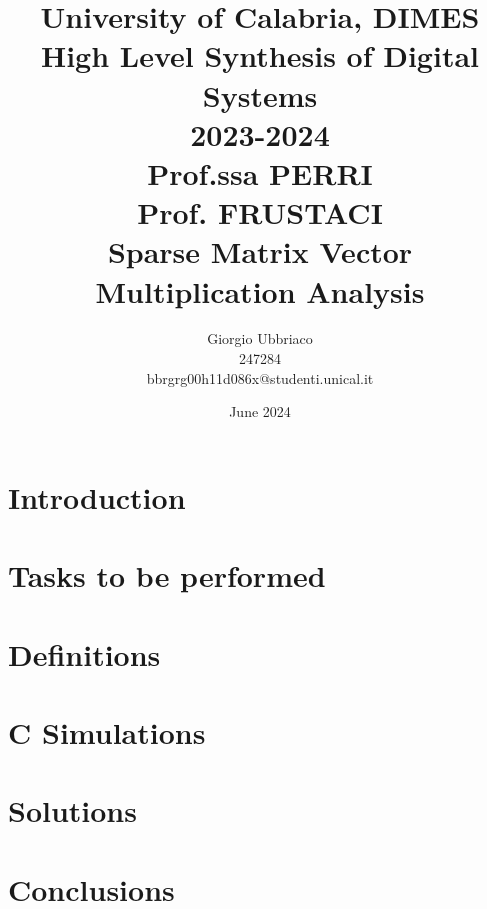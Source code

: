 \documentclass{article}
\title{University of Calabria, DIMES\\High Level Synthesis of Digital Systems\\2023-2024\\Prof.ssa PERRI\\Prof. FRUSTACI\\Sparse Matrix Vector Multiplication Analysis}
\author{Giorgio Ubbriaco \\ 247284 \\ bbrgrg00h11d086x@studenti.unical.it}
\date{June 2024}
\begin{document}
	\maketitle
	\renewcommand{\contentsname}{Index}
	\tableofcontents
	\newpage
	
	\lstlistoflistings
	\listoffigures
	\listoftables
	\newpage
	
	\section{Introduction}
	
	\newpage
	
	\section{Tasks to be performed}
	
	\newpage
	
	\section{Definitions}
	
	\newpage
	
	\section{C Simulations}
	
	\newpage
	
	\section{Solutions}
	
	\newpage
	
	\section{Conclusions}
	
	\newpage
	
\end{document}
